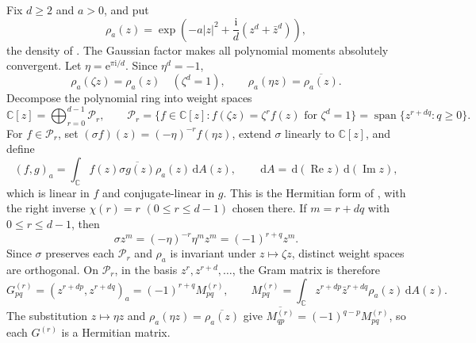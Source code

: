 \documentclass[twoside,10pt]{article}
\numberwithin{equation}{section}
\theoremstyle{slbody}
\theoremstyle{remark}
\newcommand{\C}{\mathbb C}
\newcommand{\dd}{\,\mathrm d}
\newcommand{\ii}{\mathrm i}
\newcommand{\Span}{\operatorname{span}}
\newcommand{\e}{\mathrm e}
\begin{document}
Fix \(d\geq2\) and \(a>0\), and put
\begin{equation}
\rho_a(z)=
\exp\left(-a|z|^2+\frac{\ii}{d}(z^d+\bar z^d)\right),
\label{eq:density}
\end{equation}
the density of \cite[Section~3.1]{FelderHoppe2025}.  The Gaussian
factor makes all polynomial moments absolutely convergent.  Let
\(\eta=\e^{\pi\ii/d}\).  Since \(\eta^d=-1\),
\[
\rho_a(\zeta z)=\rho_a(z)\quad(\zeta^d=1),
\qquad
\rho_a(\eta z)=\overline{\rho_a(z)}.
\]
Decompose the polynomial ring into weight spaces
\[
\C[z]=\bigoplus_{r=0}^{d-1}\mathcal P_r,
\qquad
\mathcal P_r=\{f\in\C[z]:f(\zeta z)=\zeta^r f(z)\text{ for }\zeta^d=1\}
=\Span\{z^{r+dq}:q\geq0\}.
\]
For \(f\in\mathcal P_r\), set \((\sigma f)(z)=(-\eta)^{-r}f(\eta z)\),
extend \(\sigma\) linearly to \(\C[z]\), and define
\begin{equation}
(f,g)_a
=\int_{\C}f(z)\overline{\sigma g(z)}\rho_a(z)\dd A(z),
\qquad
\dd A=\dd(\operatorname{Re}z)\dd(\operatorname{Im}z),
\label{eq:pairing}
\end{equation}
which is linear in \(f\) and conjugate-linear in \(g\).  This is the
Hermitian form of \cite[Proposition~3.1]{FelderHoppe2025}, with the
right inverse \(\chi(r)=r\) \((0\leq r\leq d-1)\) chosen there.  If
\(m=r+dq\) with \(0\leq r\leq d-1\), then
\begin{equation}
\sigma z^m=(-\eta)^{-r}\eta^m z^m=(-1)^{r+q}z^m.
\label{eq:twist-sign}
\end{equation}
Since \(\sigma\) preserves each \(\mathcal P_r\) and \(\rho_a\) is
invariant under \(z\mapsto\zeta z\), distinct weight spaces are
orthogonal.  On \(\mathcal P_r\), in the basis \(z^r,z^{r+d},\ldots\),
the Gram matrix is therefore
\begin{equation}
G_{pq}^{(r)}
=(z^{r+dp},z^{r+dq})_a=(-1)^{r+q}M_{pq}^{(r)},
\qquad
M_{pq}^{(r)}=\int_{\C}
z^{r+dp}\bar z^{r+dq}\rho_a(z)\dd A(z).
\label{eq:gram-block}
\end{equation}
The substitution \(z\mapsto\eta z\) and
\(\rho_a(\eta z)=\overline{\rho_a(z)}\) give
\(\overline{M_{qp}^{(r)}}=(-1)^{q-p}M_{pq}^{(r)}\), so each \(G^{(r)}\) is
a Hermitian matrix.
\end{document}
